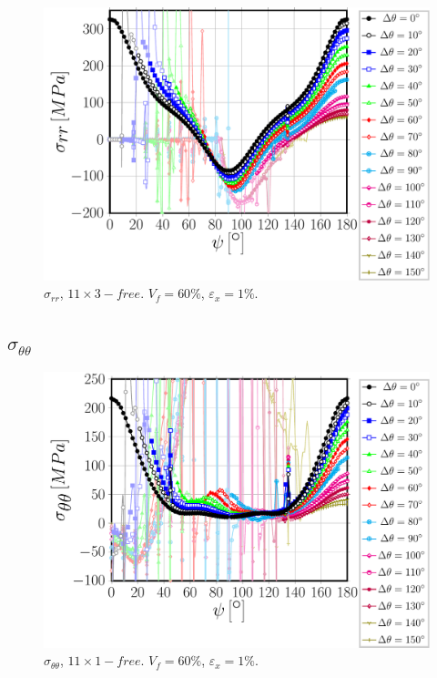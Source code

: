 \documentclass[review]{elsarticle}
\begin{document}
\begin{figure}[!h]
\centering
\includegraphics[width=\textwidth]{S5A1free-circum-sigmar.pdf}
\caption{$\sigma_{rr}$, $11\times 3-free$. $V_{f}=60\%$, $\varepsilon_{x}=1\%$.}\label{}
\end{figure}

\subsection{$\sigma_{\theta\theta}$}

\begin{figure}[!h]
\centering
\includegraphics[width=\textwidth]{S5A0free-circum-sigmatt.pdf}
\caption{$\sigma_{\theta\theta}$, $11\times 1-free$. $V_{f}=60\%$, $\varepsilon_{x}=1\%$.}\label{}
\end{figure}
\end{document}
